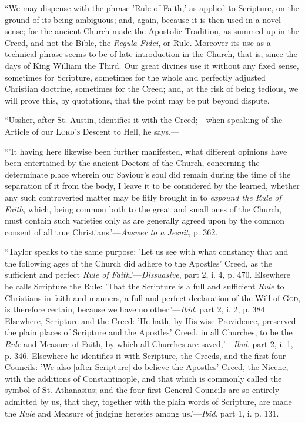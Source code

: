 ``We may dispense with the phrase 'Rule of Faith,' as applied
to Scripture, on the ground of its being ambiguous; and, again,
because it is then used in a novel sense; for the ancient Church
made the Apostolic Tradition, as summed up in the Creed, and not the
Bible, the \emph{Regula Fidei}, or Rule. Moreover its use as a
technical phrase seems to be of late introduction in the Church, that
is, since the days of King William the Third. Our great divines use it
without any fixed sense, sometimes for Scripture, sometimes for the
whole and perfectly adjusted Christian doctrine, sometimes for the
Creed; and, at the risk of being tedious, we will prove this, by
quotations, that the point may be put beyond dispute.

``Ussher, after St. Austin, identifies it with the Creed;—when
speaking of the Article of our L\textsc{ord's} Descent to
Hell, he says,—

``'It having here likewise been further
manifested, what different opinions have been entertained by the
ancient Doctors of the Church, concerning the determinate place
wherein our Saviour's soul did remain during the time of the
separation of it from the body, I leave it to be considered by the
learned, whether any such controverted matter may be fitly brought in
to \emph{expound the Rule of Faith}, which, being common both to the
great and small ones of the Church, must contain such varieties only
as are generally agreed upon by the common consent of all true
Christians.'—\emph{Answer to a Jesuit}, p. 362.

``Taylor speaks to the same purpose: 'Let us see with what
constancy that and the following ages of the Church did adhere to the
Apostles' Creed, as the sufficient and perfect \emph{Rule of Faith}.'—\emph{Dissuasive},
part 2, i. 4, p. 470. Elsewhere he calls Scripture the Rule: 'That the
Scripture is a full and sufficient \emph{Rule} to Christians in faith
and manners, a full and perfect declaration of the Will of G\textsc{od},
is therefore certain, because we have no other.'—\emph{Ibid}. part
2, i. 2, p. 384. Elsewhere, Scripture and the Creed: 'He hath, by His
wise Providence, preserved the plain places of Scripture and the
Apostles' Creed, in all Churches, to be the \emph{Rule} and Measure of
Faith, by which all Churches are saved,'—\emph{Ibid}. part 2, i. 1,
p. 346. Elsewhere he identifies it with Scripture, the Creeds,
and the first four Councils: 'We also [after Scripture] do believe the
Apostles' Creed, the Nicene, with the additions of Constantinople, and
that which is commonly called the symbol of St. Athanasius; and the
four first General Councils are so entirely admitted by us, that they,
together with the plain words of Scripture, are made the \emph{Rule}
and Measure of judging heresies among us.'—\emph{Ibid}. part 1, i.
p. 131.

